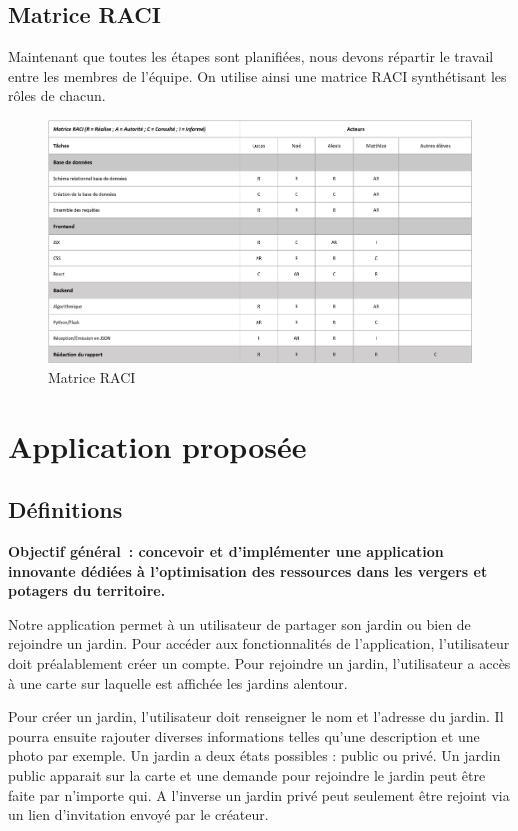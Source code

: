 \documentclass[french,a4paper]{article}
\begin{document}
\subsection{Matrice RACI}
Maintenant que toutes les étapes sont planifiées, nous devons répartir le travail entre les membres de l’équipe. On utilise ainsi une matrice RACI synthétisant les rôles de chacun.

\begin{figure}[H]
    \centering
    \includegraphics[width=1\textwidth]{img/RACI.png}
    \caption{Matrice RACI}
\end{figure} 

\newpage
\section{Application proposée}
\subsection{Définitions}
\textbf{Objectif général~: concevoir et d’implémenter une application innovante dédiées à l’optimisation des ressources dans les vergers et potagers du territoire.}

Notre application permet à un utilisateur de partager son jardin ou bien de rejoindre un jardin. Pour accéder aux fonctionnalités de l'application, l'utilisateur doit préalablement créer un compte.
Pour rejoindre un jardin, l'utilisateur a accès à une carte sur laquelle est affichée les jardins alentour.

Pour créer un jardin, l'utilisateur doit renseigner le nom et l'adresse du jardin. Il pourra ensuite rajouter diverses informations telles qu'une description et une photo par exemple. Un jardin a deux états possibles : public ou privé. Un jardin public apparait sur la carte et une demande pour rejoindre le jardin peut être faite par n'importe qui. A l'inverse un jardin privé peut seulement être rejoint via un lien d'invitation envoyé par le créateur.
\end{document}
